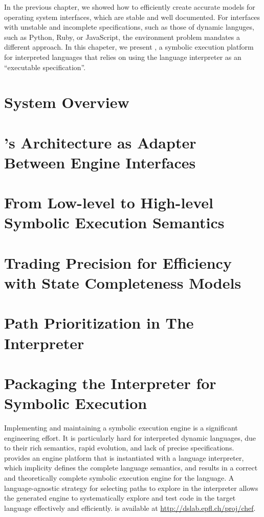 In the previous chapter, we showed how to efficiently create accurate models for operating system interfaces, which are stable and well documented.
%
For interfaces with unstable and incomplete specifications, such as those of dynamic languges, such as Python, Ruby, or JavaScript, the environment problem mandates a different approach.
%
In this chapeter, we present \chef, a symbolic execution platform for interpreted languages that relies on using the language interpreter as an ``executable specification''.

\section{System Overview}


\section{\chef's Architecture as Adapter Between Engine Interfaces}


\section{From Low-level to High-level Symbolic Execution Semantics}


\section{Trading Precision for Efficiency with State Completeness Models}
\label{sec:chef:completeness-models}


\section{Path Prioritization in The Interpreter}
\label{sec:chef:strategies}


\section{Packaging the Interpreter for Symbolic Execution}
\label{sec:chef:recipe}


\vspace{18pt}

Implementing and maintaining a symbolic execution engine is a significant engineering effort. It is particularly hard for interpreted dynamic languages, due to their rich semantics, rapid evolution, and lack of precise specifications.
%
\chef provides an engine platform that is instantiated with a language interpreter, which implicity defines the complete language semantics, and results in a correct and theoretically complete symbolic execution engine for the language.
%
A language-agnostic strategy for selecting paths to explore in the interpreter allows the generated engine to systematically explore and test code in the target language effectively and efficiently.
%
\chef is available at {\url{http://dslab.epfl.ch/proj/chef}}.


